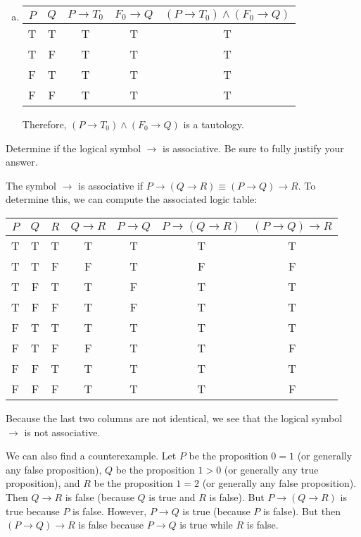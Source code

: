 \documentclass[11pt,letterpaper]{article}
\begin{document}
\begin{enumerate}[(a)]
\item \phantom{.}
	\begin{table}[!ht]
	\centering
	\begin{tabular}{c|c||c|c|c}
	$P$ & $Q$ & $P \to T_0$ & $F_0 \to Q$ & $(P \to T_0) \wedge (F_0 \to Q)$ \\ \hline
	T & T & T & T & T \\
	T & F & T & T & T \\
	F & T & T & T & T \\
	F & F & T & T & T
	\end{tabular}
	\end{table} \par
Therefore, $(P \to T_0) \wedge (F_0 \to Q)$ is a tautology. 
\end{enumerate}



\newpage



 Determine if the logical symbol $\to$ is associative. Be sure to fully justify your answer. 

\sol The symbol $\to$ is associative if $P \to (Q \to R) \equiv (P \to Q) \to R$. To determine this, we can compute the associated logic table:
	\begin{table}[!ht]
	\centering
	\begin{tabular}{c|c|c||c|c||c|c}
	$P$ & $Q$ & $R$ & $Q \to R$ & $P \to Q$ & $P \to (Q \to R)$ & $(P \to Q) \to R$ \\ \hline
	T & T & T & T & T & T & T \\
	T & T & F & F & T & F & F \\
	T & F & T & T & F & T & T \\
	T & F & F & T & F & T & T \\
	F & T & T & T & T & T & T \\
	F & T & F & F & T & T & F \\
	F & F & T & T & T & T & T \\
	F & F & F & T & T & T & F
	\end{tabular}
	\end{table} \par
Because the last two columns are not identical, we see that the logical symbol $\to$ is not associative. 

We can also find a counterexample. Let $P$ be the proposition $0= 1$ (or generally any false proposition), $Q$ be the proposition $1 > 0$ (or generally any true proposition), and $R$ be the proposition $1= 2$ (or generally any false proposition). Then $Q \to R$ is false (because $Q$ is true and $R$ is false). But $P \to (Q \to R)$ is true because $P$ is false. However, $P \to Q$ is true (because $P$ is false). But then $(P \to Q) \to R$ is false because $P \to Q$ is true while $R$ is false. 
\end{document}
